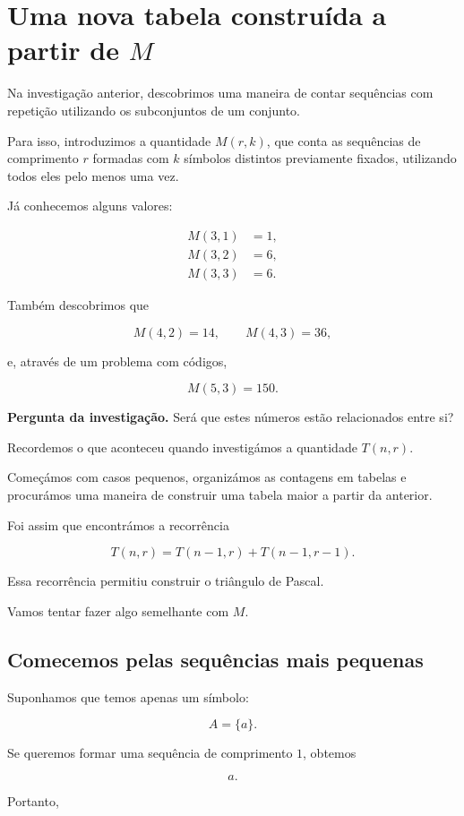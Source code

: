 \documentclass[11pt,a4paper,oneside]{book}
\newcommand{\Pergunta}[1]{\begin{perguntabox}\textbf{Pergunta da investigação.} #1\end{perguntabox}}
\begin{document}
\section*{Uma nova tabela construída a partir de $M$}

Na investigação anterior, descobrimos uma maneira
de contar sequências com repetição utilizando
os subconjuntos de um conjunto.

Para isso, introduzimos a quantidade $M(r,k)$,
que conta as sequências de comprimento $r$
formadas com $k$ símbolos distintos previamente
fixados, utilizando todos eles pelo menos uma vez.

Já conhecemos alguns valores:

\[
\begin{aligned}
M(3,1)&=1,\\
M(3,2)&=6,\\
M(3,3)&=6.
\end{aligned}
\]

Também descobrimos que

\[
M(4,2)=14,
\qquad
M(4,3)=36,
\]

e, através de um problema com códigos,

\[
M(5,3)=150.
\]

\Pergunta{Será que estes números estão
relacionados entre si?}

Recordemos o que aconteceu quando investigámos
a quantidade $T(n,r)$.

Começámos com casos pequenos, organizámos
as contagens em tabelas e procurámos
uma maneira de construir uma tabela maior
a partir da anterior.

Foi assim que encontrámos a recorrência

\[
T(n,r)=T(n-1,r)+T(n-1,r-1).
\]

Essa recorrência permitiu construir
o triângulo de Pascal.

Vamos tentar fazer algo semelhante com $M$.

\subsection*{Comecemos pelas sequências mais pequenas}

Suponhamos que temos apenas um símbolo:

\[
A=\{a\}.
\]

Se queremos formar uma sequência de
comprimento $1$, obtemos

\[
a.
\]

Portanto,
\end{document}
